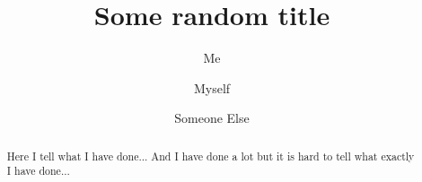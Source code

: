 \documentclass[aps,prl,reprint]{revtex4-1}
\begin{document}
\title{Some random title}
\author{Me}
\author{Myself}
\author{Someone Else}

\begin{abstract}
Here I tell what I have done... And I have done a lot but it is hard to tell what exactly I have done...
\end{abstract}

\maketitle

\blindtext \cite{article-minimal}

\end{document}
